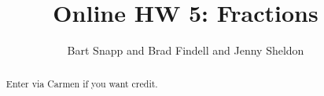 \documentclass[handout,space,nooutcomes]{xourse}
\title{Online HW 5: Fractions}
\author{Bart Snapp and Brad Findell and Jenny Sheldon}
\begin{document}
\begin{abstract}
Enter via Carmen if you want credit.   
\end{abstract}
\maketitle


\end{document}

